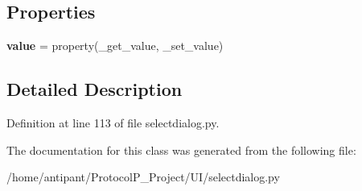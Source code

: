 \subsection*{Properties}
\begin{DoxyCompactItemize}
\item 
\hypertarget{classselectdialog_1_1ScrollBar_a31ff84ff656c43eec236f25b2586d8a5}{{\bfseries value} = property(\-\_\-get\-\_\-value, \-\_\-set\-\_\-value)}\label{classselectdialog_1_1ScrollBar_a31ff84ff656c43eec236f25b2586d8a5}

\end{DoxyCompactItemize}


\subsection{Detailed Description}


Definition at line 113 of file selectdialog.\-py.



The documentation for this class was generated from the following file\-:\begin{DoxyCompactItemize}
\item 
/home/antipant/\-Protocol\-P\-\_\-\-Project/\-U\-I/selectdialog.\-py\end{DoxyCompactItemize}
